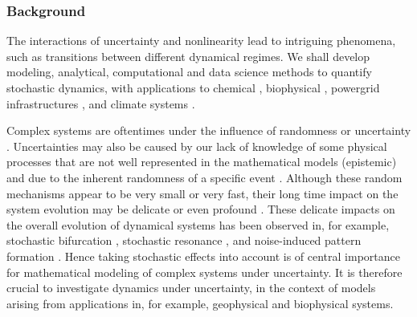 \documentclass[11pt]{NSFamsart}
\begin{document}
\subsubsection*{Background} The interactions of uncertainty and nonlinearity lead to intriguing phenomena, such as  transitions   between  different dynamical regimes. We shall develop modeling, analytical, computational and data science  methods to quantify stochastic dynamics, with applications to chemical \cite{agaoglou_chemical_2019}, biophysical \cite{Ruoff2018BiologicalCR}, powergrid infrastructures \cite{MEDJROUBI201714}, and climate systems \cite{Alexandrov2020NonlinearCD, Franzke2017NonlinearAS, Wan2020ADF}. 
 
Complex systems are oftentimes under the influence of randomness or uncertainty \cite{Moss1, Horst, Gar, VanKampen3}. Uncertainties may also be caused by our lack of knowledge of some physical processes that are not well represented in the mathematical models (epistemic) and due to the inherent randomness of a specific event  \cite{Palmer1, Kantz, Wilks, Williams}.
Although these random mechanisms appear to be very small or very fast, their long time impact on the system evolution may be delicate or even profound \cite{Arnold, DuanBook2015}. These delicate impacts on the overall evolution of dynamical systems has been observed in, for example, stochastic bifurcation
\cite{Crauel, CarLanRob01, Horst}, stochastic resonance \cite{imkeller2002model},
 and  noise-induced pattern formation \cite{Gar, blomker2003pattern}.
Hence taking stochastic effects   into account is of
central importance for mathematical modeling of
complex systems under uncertainty.   It is therefore crucial to investigate dynamics under uncertainty, in the context of models arising from applications in, for example, geophysical and biophysical systems. 
\end{document}
